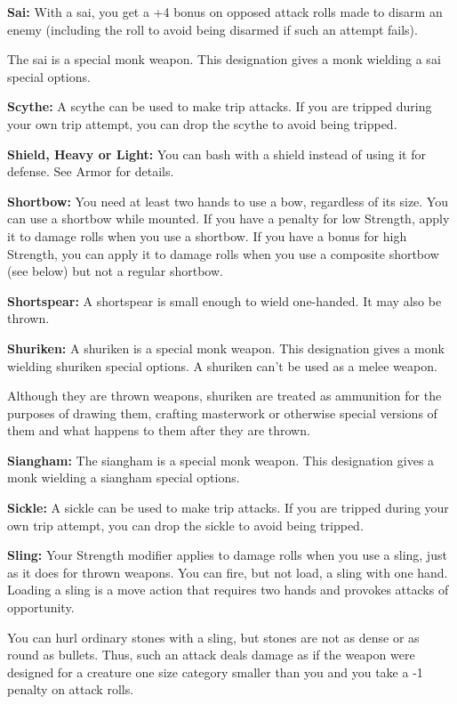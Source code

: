 \begin{multicols}{2}
\textbf{Sai:} With a sai, you get a +4 bonus on opposed attack rolls made to disarm an enemy (including the roll to avoid being disarmed if such an attempt fails).

The sai is a special monk weapon. This designation gives a monk wielding a sai special options.

\textbf{Scythe:} A scythe can be used to make trip attacks. If you are tripped during your own trip attempt, you can drop the scythe to avoid being tripped.

\textbf{Shield, Heavy or Light:} You can bash with a shield instead of using it for defense. See Armor for details.

\textbf{Shortbow:} You need at least two hands to use a bow, regardless of its size. You can use a shortbow while mounted. If you have a penalty for low Strength, apply it to damage rolls when you use a shortbow. If you have a bonus for high Strength, you can apply it to damage rolls when you use a composite shortbow (see below) but not a regular shortbow.

\textbf{Shortspear:} A shortspear is small enough to wield one-handed. It may also be thrown.

\textbf{Shuriken:} A shuriken is a special monk weapon. This designation gives a monk wielding shuriken special options. A shuriken can't be used as a melee weapon.

Although they are thrown weapons, shuriken are treated as ammunition for the purposes of drawing them, crafting masterwork or otherwise special versions of them and what happens to them after they are thrown.

\textbf{Siangham:} The siangham is a special monk weapon. This designation gives a monk wielding a siangham special options.

\textbf{Sickle:} A sickle can be used to make trip attacks. If you are tripped during your own trip attempt, you can drop the sickle to avoid being tripped.

\textbf{Sling:} Your Strength modifier applies to damage rolls when you use a sling, just as it does for thrown weapons. You can fire, but not load, a sling with one hand. Loading a sling is a move action that requires two hands and provokes attacks of opportunity.

You can hurl ordinary stones with a sling, but stones are not as dense or as round as bullets. Thus, such an attack deals damage as if the weapon were designed for a creature one size category smaller than you and you take a -1 penalty on attack rolls.


\end{multicols}
